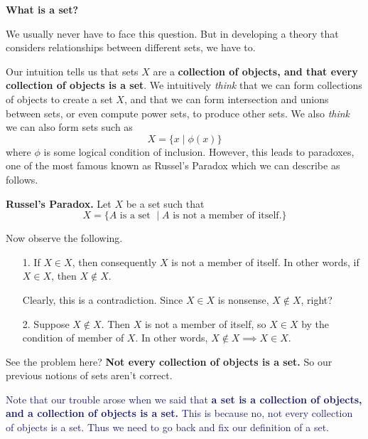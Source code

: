     \begin{center}
    \textbf{What is a set?}
    \end{center}
    We usually never have to face this question. But in developing a
    theory that considers relationships between different sets, we
    have to. 
    
    Our intuition tells us that sets $X$ are a \textbf{collection of
    objects, and that every collection of objects is a set}. We
    intuitively \textit{think} that  
    we can form collections of objects to create a set $X$, and that
    we can form 
    intersection and unions between sets, or even compute power
    sets, to produce other sets. We also \textit{think} we can also form sets such as 
    \[
        X = \{x \mid \phi(x) \}
    \]
    where $\phi$ is some logical condition of inclusion. However, this
    leads to paradoxes, one of the most famous known as Russel's
    Paradox which we can describe as follows. 

    \noindent\textbf{Russel's Paradox.}
    Let $X$ be a set such that 
    \[
        X = \{A \text{ is a set }\mid A \text{ is not a member of itself.}\}
    \]
    
    Now observe the following. 
    \begin{itemize}
        \item[1.] If $X \in X$, then consequently $X$ is not a member
        of itself. In other words, if $X \in X$, then $X \not\in X$.

        Clearly, this is a contradiction. Since $X \in X$ is nonsense,
        $X \not\in X$, right? 

        \item[2.] Suppose $X \not\in X$. Then $X$ is not a member of
        itself, so $X \in X$ by the condition of member of $X$. In
        other words, $X \not\in X \implies X \in X$.
    \end{itemize}
    See the problem here? \textbf{Not every collection of objects is a
    set.} So our previous notions of sets aren't correct.

    \textcolor{MidnightBlue}{Note that our trouble arose when we said
    that \textbf{a set is a collection of objects, and a collection of
    objects is a set.} 
    This is because no, not every collection of objects is a set.
    Thus we need to go back and fix our definition of a set.
    }

